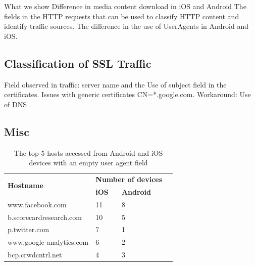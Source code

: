 What we show
Difference in media content download in iOS and Android
The fields in the HTTP requests that can be used to classify HTTP content and identify traffic sources. 
The difference in the use of UserAgents in Android and iOS. 

\subsection{Classification of SSL Traffic}

Field observed in traffic:
server name and the 
Use of subject field in the certificates. 
Issues with generic certificates CN=*.google.com.
Workaround:
Use of DNS

\cite{chen:wifi}


\subsection{Misc}

\begin{table}
\begin{tabular}{|l|l|l|l|}
\hline
\multirow{2}{*}{\bf Hostname} & \multicolumn{2}{|c|}{\bf Number of devices}\tabularnewline
\cline{2-3}
    & {\bf iOS} & {\bf Android} \tabularnewline
\hline
www.facebook.com & 11 & 8 \tabularnewline
b.scorecardresearch.com	& 10 &	5 \tabularnewline
p.twitter.com	& 7 & 1 \tabularnewline
www.google-analytics.com &  6 & 2 \tabularnewline
bcp.crwdcntrl.net & 4 &	3 \tabularnewline
\hline
\end{tabular}
\caption{The top 5 hosts accessed from Android and iOS devices with an empty user agent field}
\label{tab:top-hosts-empty-agent}
\end{table}






